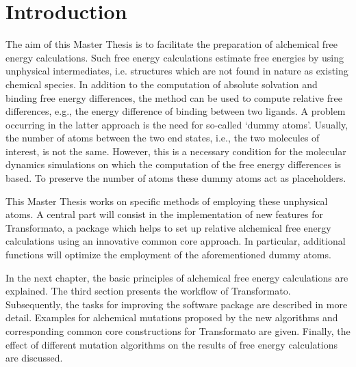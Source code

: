 \chapter{Introduction}

The aim of this Master Thesis is to facilitate the preparation of
alchemical free energy calculations. Such free energy calculations
estimate free energies by using unphysical intermediates, i.e. structures
which are not found in nature as existing chemical species. In addition
to the computation of absolute solvation and binding free energy differences,
the method can be used to compute relative free differences, e.g.,
the energy difference of binding between two ligands. A problem occurring
in the latter approach is the need for so-called \textquoteleft dummy
atoms\textquoteright . Usually, the number of atoms between the two
end states, i.e., the two molecules of interest, is not the same.
However, this is a necessary condition for the molecular dynamics
simulations on which the computation of the free energy differences
is based. To preserve the number of atoms these dummy atoms act as
placeholders\cite{Fleck.2021}. 

This Master Thesis works on specific methods of employing these unphysical
atoms. A central part will consist in the implementation of new features
for Transformato, a package which helps to set up relative alchemical
free energy calculations using an innovative common core approach\cite{key-2}.
In particular, additional functions will optimize the employment of
the aforementioned dummy atoms.

In the next chapter, the basic principles of alchemical free energy
calculations are explained. The third section presents the workflow
of Transformato. Subsequently, the tasks for improving the software
package are described in more detail. Examples for alchemical mutations
proposed by the new algorithms and corresponding common core constructions
for Transformato are given. Finally, the effect of different mutation
algorithms on the results of free energy calculations are discussed.
